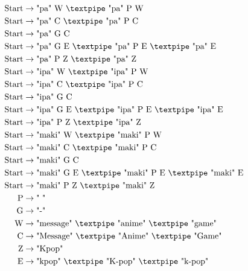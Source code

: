 \begin{equation*}
    \begin{aligned}
        \text{Start}  & \rightarrow \text{"pa" W {\textpipe} "pa" P W}   \\
        \text{Start}  & \rightarrow \text{"pa" C {\textpipe} "pa" P C}   \\
        \text{Start}  & \rightarrow \text{"pa" G C}   \\
        \text{Start}  & \rightarrow \text{"pa" G E {\textpipe} "pa" P E {\textpipe} "pa" E} \\   
        \text{Start}  & \rightarrow \text{"pa" P Z {\textpipe} "pa" Z}      \\
        \text{Start}  & \rightarrow \text{"ipa" W {\textpipe} "ipa" P W}   \\
        \text{Start}  & \rightarrow \text{"ipa" C {\textpipe} "ipa" P C}   \\
        \text{Start}  & \rightarrow \text{"ipa" G C}   \\
        \text{Start}  & \rightarrow \text{"ipa" G E {\textpipe} "ipa" P E {\textpipe} "ipa" E} \\   
        \text{Start}  & \rightarrow \text{"ipa" P Z {\textpipe} "ipa" Z}      \\
        \text{Start}  & \rightarrow \text{"maki" W {\textpipe} "maki" P W}   \\
        \text{Start}  & \rightarrow \text{"maki" C {\textpipe} "maki" P C}   \\
        \text{Start}  & \rightarrow \text{"maki" G C}   \\
        \text{Start}  & \rightarrow \text{"maki" G E {\textpipe} "maki" P E {\textpipe} "maki" E} \\   
        \text{Start}  & \rightarrow \text{"maki" P Z {\textpipe} "maki" Z}      \\
        \text{P}   & \rightarrow \text{" "}\\
        \text{G} & \rightarrow \text{"-"}\\        
        \text{W} & \rightarrow \text{"message" {\textpipe} "anime" {\textpipe} "game"}\\
        \text{C} & \rightarrow \text{"Message" {\textpipe} "Anime" {\textpipe} "Game"}\\
        \text{Z} & \rightarrow \text{"Kpop"}\\        
        \text{E} & \rightarrow \text{"kpop" {\textpipe} "K-pop" {\textpipe} "k-pop"}
    \end{aligned}
\end{equation*}

